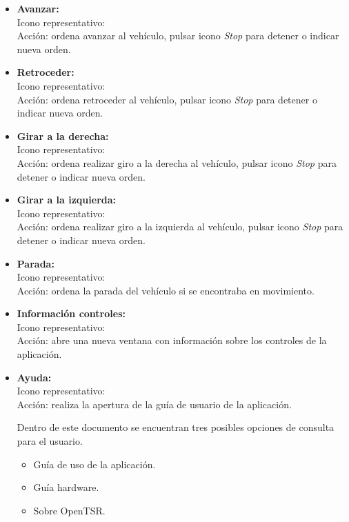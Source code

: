 \begin{itemize}
\item \textbf{Avanzar:}\\
Icono representativo:\quad  {} \\
Acción: ordena avanzar al vehículo, pulsar icono \emph{Stop} para detener o indicar nueva orden.

\item \textbf{Retroceder:}\\
Icono representativo:\quad  {} \\
Acción: ordena retroceder al vehículo, pulsar icono \emph{Stop} para detener o indicar nueva orden.

\item \textbf{Girar a la derecha:}\\
Icono representativo:\quad  {} \\
Acción: ordena realizar giro a la derecha al vehículo, pulsar icono \emph{Stop} para detener o indicar nueva orden.

\item \textbf{Girar a la izquierda:}\\
Icono representativo:\quad  {} \\
Acción: ordena realizar giro a la izquierda al vehículo, pulsar icono \emph{Stop} para detener o indicar nueva orden.

\item \textbf{Parada:}\\
Icono representativo:\quad  {} \\
Acción: ordena la parada del vehículo si se encontraba en movimiento.

\item \textbf{Información controles:}\\
Icono representativo:\quad {} \\
Acción: abre una nueva ventana con información sobre los controles de la aplicación.

\item \textbf{Ayuda:}\\
Icono representativo:\quad {} \\
Acción: realiza la apertura de la guía de usuario de la aplicación.

Dentro de este documento se encuentran tres posibles opciones de consulta para el usuario.
\begin{itemize}
\item Guía de uso de la aplicación.
\item Guía hardware.
\item Sobre OpenTSR.
\end{itemize}


\end{itemize}
